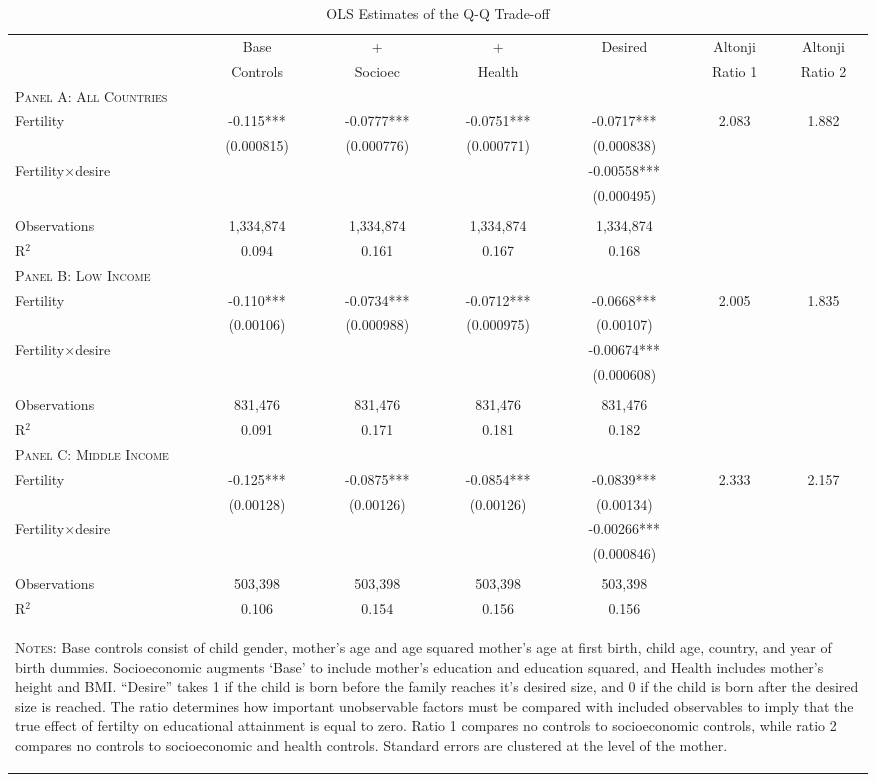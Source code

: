 \begin{landscape}\begin{table}[!htbp] \centering 
\caption{OLS Estimates of the Q-Q Trade-off} 
 \label{TWINtab:OLS} 
\begin{tabular}{lcccccc} \toprule \toprule 
&Base&+&+&Desired&Altonji&Altonji\\
&Controls&Socioec&Health&&Ratio 1&Ratio 2\\\midrule
\textsc{Panel A: All Countries}&&&&&&\\
Fertility &-0.115***&-0.0777***&-0.0751***&-0.0717***&2.083&1.882\\
&(0.000815)&(0.000776)&(0.000771)&(0.000838)&&\\
Fertility$\times$desire&&&&-0.00558***&&\\
&&&&(0.000495)&&\\
&&&&&&\\
Observations &1,334,874&1,334,874&1,334,874&1,334,874&&\\
R$^2$&0.094&0.161&0.167&0.168&&\\\midrule
\textsc{Panel B: Low Income}&&&&&&\\
Fertility &-0.110***&-0.0734***&-0.0712***&-0.0668***&2.005&1.835\\
&(0.00106)&(0.000988)&(0.000975)&(0.00107)&&\\
Fertility$\times$desire&&&&-0.00674***&&\\
&&&&(0.000608)&&\\
&&&&&&\\
Observations &831,476&831,476&831,476&831,476&&\\
R$^2$&0.091&0.171&0.181&0.182&&\\\midrule
\textsc{Panel C: Middle Income}&&&&&&\\
Fertility &-0.125***&-0.0875***&-0.0854***&-0.0839***&2.333&2.157\\
&(0.00128)&(0.00126)&(0.00126)&(0.00134)&&\\
Fertility$\times$desire&&&&-0.00266***&&\\
&&&&(0.000846)&&\\
&&&&&&\\
Observations &503,398&503,398&503,398&503,398&&\\
R$^2$&0.106&0.154&0.156&0.156&&\\\hline\hline
\multicolumn{7}{p{15.8cm}}{\begin{footnotesize}\textsc{Notes:} Base controls consist of child gender, mother's age and age squared mother's age at first birth, child age, country, and year of birth dummies.  Socioeconomic augments `Base' to include mother's education and education squared, and Health includes mother's height and BMI. ``Desire'' takes 1 if the child is born before the family reaches it's desired size, and 0 if the child is born after the desired size is reached. The \citet{Altonjietal2005} ratio determines how important unobservable factors must be compared with included observables to imply that the true effect of fertilty on educational attainment is equal to zero.  Ratio 1 compares no controls to socioeconomic controls, while ratio 2 compares no controls to socioeconomic and health controls. Standard errors are clustered at the level of the mother.

\end{footnotesize}}
\end{tabular}
\end{table}
\end{landscape}
